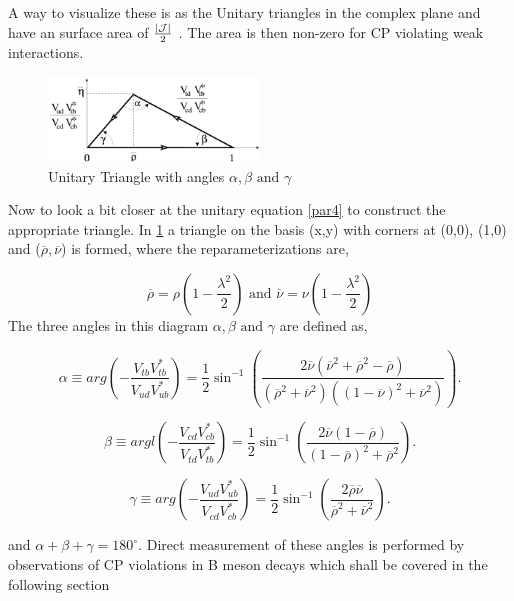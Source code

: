 A way to visualize these is as the Unitary triangles in the complex plane and have an surface area of $\frac{\left|\cal{J}\right|}{2}$ \cite{CKM11}. The area is then non-zero for CP violating weak interactions.

\begin{figure}[h]
\centering
\includegraphics[width=0.5\textwidth]{figs/ckmfig5.jpg}
\caption{Unitary Triangle with angles $\alpha, \beta \mbox{ and } \gamma$}
\label{tri4}
\end{figure}
Now to look a bit closer at the unitary equation  \ref{par4} to construct the appropriate triangle. In \cref{tri4} a triangle on the basis (x,y) with corners at (0,0), (1,0) and ($\overline{\rho},\overline{\nu}$) is formed, where the reparameterizations are,

\begin{equation}\label{pv1}
\overline{\rho}=\rho\left(1-\frac{\lambda^2}{2}\right) \mbox{ and } \overline{\nu}=\nu\left(1-\frac{\lambda^2}{2}\right)
\end{equation}
The three angles in this diagram $\alpha , \beta \mbox{ and } \gamma$ are defined as,

\begin{equation}\label{ang1}
 \alpha\equiv arg\left(-\frac{V_{tb}V^{*}_{tb}}{V_{ud}V^{*}_{ub}}\right) =\frac{1}{2}\sin^{-1}\left(\frac{2\overline{\nu}(\overline{\nu}^2+\overline{\rho}^2-\overline{\rho})}{(\overline{\rho}^2+\overline{\nu}^2)((1-\overline{\nu})^2+\overline{\nu}^2)}\right) .
\end{equation}

\begin{equation}\label{ang2}
\beta\equiv argl\left(-\frac{V_{cd}V^{*}_{cb}}{V_{td}V^{*}_{tb}}\right) = \frac{1}{2}\sin^{-1}\left(\frac{2\overline{\nu}(1-\overline{\rho})}{(1-\overline{\rho})^2+\overline{\rho}^2}\right).
\end{equation}

\begin{equation}\label{ang3}
\gamma\equiv arg\left(-\frac{V_{ud}V^{*}_{ub}}{V_{cd}V^{*}_{cb}}\right) = \frac{1}{2}\sin^{-1}\left(\frac{2\overline{\rho}\overline{\nu}}{\overline{\rho}^2+\overline{\nu}^2}\right).
\end{equation}

and $\alpha + \beta + \gamma = 180^{\circ}$. Direct measurement of these angles is performed by observations of CP violations in B meson decays which shall be covered in the following section \cite{CKM7}
